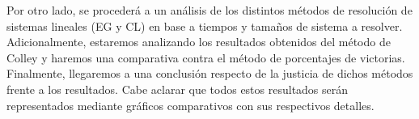 Por otro lado, se procederá a un análisis de los distintos métodos de resolución de sistemas lineales (EG y CL) en base a tiempos y tamaños de sistema a resolver. Adicionalmente, estaremos analizando los resultados obtenidos del método de Colley y haremos una comparativa contra el método de porcentajes de victorias. 
Finalmente, llegaremos a una conclusión respecto de la justicia de dichos métodos frente a los resultados. Cabe aclarar que todos estos resultados serán representados mediante gráficos comparativos con sus respectivos detalles.

